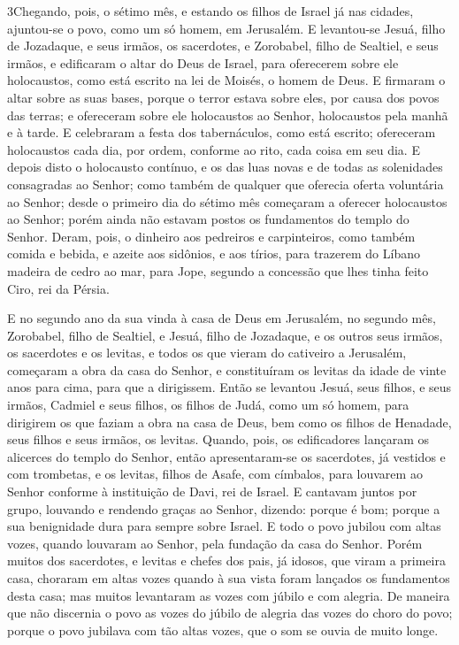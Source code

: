 \medskip

\lettrine{3} Chegando, pois, o sétimo mês, e estando os filhos
de Israel já nas cidades, ajuntou-se o povo, como um só homem, em
Jerusalém. E levantou-se Jesuá, filho de Jozadaque, e seus
irmãos, os sacerdotes, e Zorobabel, filho de Sealtiel, e seus
irmãos, e edificaram o altar do Deus de Israel, para oferecerem
sobre ele holocaustos, como está escrito na lei de Moisés, o homem
de Deus. E firmaram o altar sobre as suas bases, porque o terror
estava sobre eles, por causa dos povos das terras; e ofereceram
sobre ele holocaustos ao Senhor, holocaustos pela manhã e à tarde.
E celebraram a festa dos tabernáculos, como está escrito;
ofereceram holocaustos cada dia, por ordem, conforme ao rito, cada
coisa em seu dia. E depois disto o holocausto contínuo, e os das
luas novas e de todas as solenidades consagradas ao Senhor; como
também de qualquer que oferecia oferta voluntária ao Senhor;
desde o primeiro dia do sétimo mês começaram a oferecer
holocaustos ao Senhor; porém ainda não estavam postos os fundamentos
do templo do Senhor. Deram, pois, o dinheiro aos pedreiros e
carpinteiros, como também comida e bebida, e azeite aos sidônios, e
aos tírios, para trazerem do Líbano madeira de cedro ao mar, para
Jope, segundo a concessão que lhes tinha feito Ciro, rei da Pérsia.

E no segundo ano da sua vinda à casa de Deus em Jerusalém, no
segundo mês, Zorobabel, filho de Sealtiel, e Jesuá, filho de
Jozadaque, e os outros seus irmãos, os sacerdotes e os levitas, e
todos os que vieram do cativeiro a Jerusalém, começaram a obra da
casa do Senhor, e constituíram os levitas da idade de vinte anos
para cima, para que a dirigissem. Então se levantou Jesuá, seus
filhos, e seus irmãos, Cadmiel e seus filhos, os filhos de Judá,
como um só homem, para dirigirem os que faziam a obra na casa de
Deus, bem como os filhos de Henadade, seus filhos e seus irmãos, os
levitas. Quando, pois, os edificadores lançaram os alicerces
do templo do Senhor, então apresentaram-se os sacerdotes, já
vestidos e com trombetas, e os levitas, filhos de Asafe, com
címbalos, para louvarem ao Senhor conforme à instituição de Davi,
rei de Israel. E cantavam juntos por grupo, louvando e
rendendo graças ao Senhor, dizendo: porque é bom; porque a sua
benignidade dura para sempre sobre Israel. E todo o povo jubilou com
altas vozes, quando louvaram ao Senhor, pela fundação da casa do
Senhor. Porém muitos dos sacerdotes, e levitas e chefes dos
pais, já idosos, que viram a primeira casa, choraram em altas vozes
quando à sua vista foram lançados os fundamentos desta casa; mas
muitos levantaram as vozes com júbilo e com alegria. De
maneira que não discernia o povo as vozes do júbilo de alegria das
vozes do choro do povo; porque o povo jubilava com tão altas vozes,
que o som se ouvia de muito longe.

